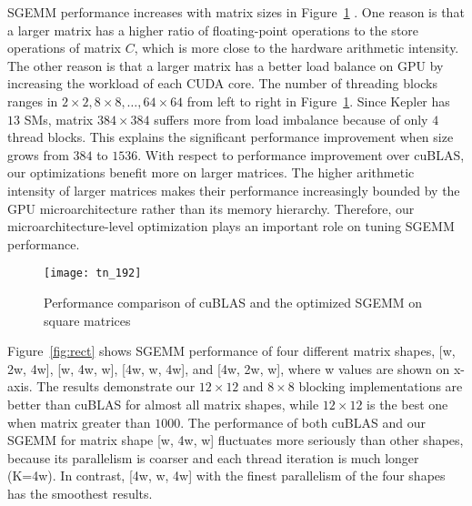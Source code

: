 SGEMM performance increases with matrix sizes in Figure~\ref{fig:sgemm_tn} . 
One reason is that a larger matrix has a higher ratio of 
floating-point operations to the store operations of matrix $C$, which is more close to the hardware arithmetic intensity. 
The other reason is that a larger matrix has a better load balance on GPU by increasing the workload of each CUDA core.
The number of threading blocks ranges in $2 \times 2, 8 \times 8, \dots, 64 \times 64$ from left to right in Figure~\ref{fig:sgemm_tn}.
Since Kepler has $13$ SMs, matrix $384\times 384$ suffers more from load imbalance because of only $4$ thread blocks.
This explains the significant performance improvement when size grows from $384$ to $1536$. 
With respect to performance improvement over cuBLAS, our optimizations benefit more on larger matrices. 
The higher arithmetic intensity of larger matrices makes their performance increasingly bounded by the GPU microarchitecture rather than its memory hierarchy. 
Therefore, our microarchitecture-level optimization plays an important role on tuning SGEMM
performance.

\begin{figure}[htbp]
\begin{center}
\texttt{[image: tn\_192]}
\caption{Performance comparison of cuBLAS and the optimized SGEMM on square matrices}
\label{fig:sgemm_tn}
\end{center}
\end{figure}


Figure~\ref{fig:rect} shows SGEMM performance of four different matrix shapes, [w, 2w, 4w], [w, 4w, w], [4w, w, 4w], and [4w, 2w, w], where w values are shown on x-axis.
The results demonstrate our $12\times12$ and $8\times8$ blocking implementations are better than cuBLAS for almost all matrix shapes, while $12\times12$ is the best one when matrix greater than $1000$.
The performance of both cuBLAS and our SGEMM for matrix shape [w, 4w, w] fluctuates more seriously than other shapes, because its parallelism is coarser and each thread iteration is much longer (K=4w).
In contrast, [4w, w, 4w] with the finest parallelism of the four shapes has the smoothest results.

